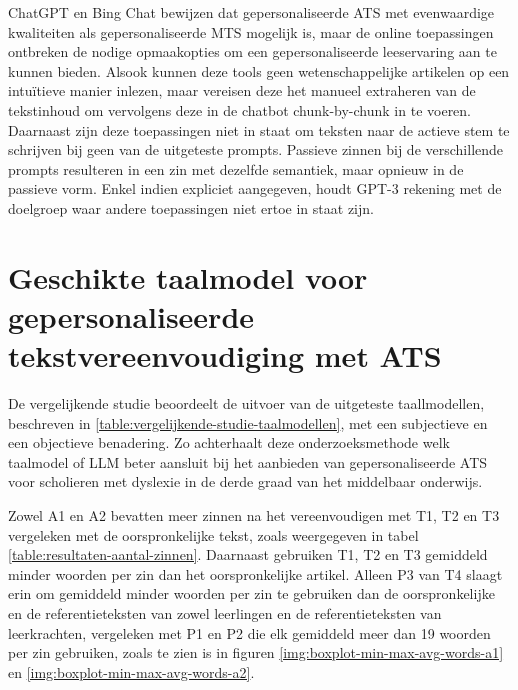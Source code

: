 ChatGPT en Bing Chat bewijzen dat gepersonaliseerde ATS met evenwaardige kwaliteiten als gepersonaliseerde MTS mogelijk is, maar de online toepassingen ontbreken de nodige opmaakopties om een gepersonaliseerde leeservaring aan te kunnen bieden. Alsook kunnen deze tools geen wetenschappelijke artikelen op een intuïtieve manier inlezen, maar vereisen deze het manueel extraheren van de tekstinhoud om vervolgens deze in de chatbot chunk-by-chunk in te voeren. Daarnaast zijn deze toepassingen niet in staat om teksten naar de actieve stem te schrijven bij geen van de uitgeteste prompts. Passieve zinnen bij de verschillende prompts resulteren in een zin met dezelfde semantiek, maar opnieuw in de passieve vorm. Enkel indien expliciet aangegeven, houdt GPT-3 rekening met de doelgroep waar andere toepassingen niet ertoe in staat zijn.

\section{Geschikte taalmodel voor gepersonaliseerde tekstvereenvoudiging met ATS}


De vergelijkende studie beoordeelt de uitvoer van de uitgeteste taallmodellen, beschreven in \ref{table:vergelijkende-studie-taalmodellen}, met een subjectieve en een objectieve benadering. Zo achterhaalt deze onderzoeksmethode welk taalmodel of LLM beter aansluit bij het aanbieden van gepersonaliseerde ATS voor scholieren met dyslexie in de derde graad van het middelbaar onderwijs. 

\medspace

Zowel A1 en A2 bevatten meer zinnen na het vereenvoudigen met T1, T2 en T3 vergeleken met de oorspronkelijke tekst, zoals weergegeven in tabel \ref{table:resultaten-aantal-zinnen}. Daarnaast gebruiken T1, T2 en T3 gemiddeld minder woorden per zin dan het oorspronkelijke artikel. Alleen P3 van T4 slaagt erin om gemiddeld minder woorden per zin te gebruiken dan de oorspronkelijke en de referentieteksten van zowel leerlingen en de referentieteksten van leerkrachten, vergeleken met P1 en P2 die elk gemiddeld meer dan 19 woorden per zin gebruiken, zoals te zien is in figuren \ref{img:boxplot-min-max-avg-words-a1} en \ref{img:boxplot-min-max-avg-words-a2}. 

